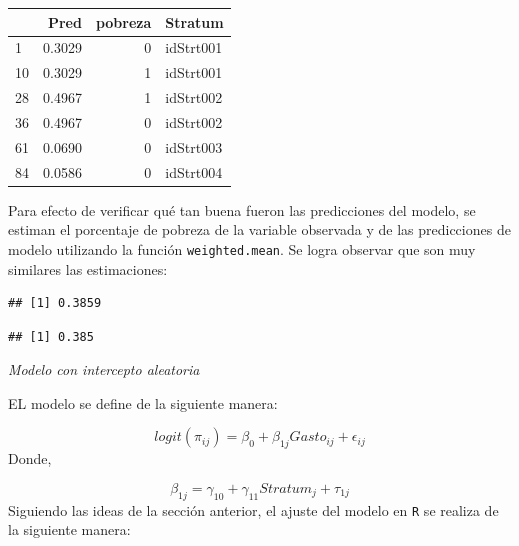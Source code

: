 \documentclass[
  12pt,
]{book}
\newenvironment{Shaded}{\begin{snugshade}}{\end{snugshade}}
\newcommand{\FunctionTok}[1]{\textcolor[rgb]{0.13,0.29,0.53}{\textbf{#1}}}
\newcommand{\NormalTok}[1]{#1}
\newcommand{\SpecialCharTok}[1]{\textcolor[rgb]{0.81,0.36,0.00}{\textbf{#1}}}
\begin{document}
\begin{tabular}{l|r|r|l}
\hline
  & Pred & pobreza & Stratum\\
\hline
1 & 0.3029 & 0 & idStrt001\\
\hline
10 & 0.3029 & 1 & idStrt001\\
\hline
28 & 0.4967 & 1 & idStrt002\\
\hline
36 & 0.4967 & 0 & idStrt002\\
\hline
61 & 0.0690 & 0 & idStrt003\\
\hline
84 & 0.0586 & 0 & idStrt004\\
\hline
\end{tabular}

Para efecto de verificar qué tan buena fueron las predicciones del modelo, se estiman el porcentaje de pobreza de la variable observada y de las predicciones de modelo utilizando la función \texttt{weighted.mean}. Se logra observar que son muy similares las estimaciones:

\begin{Shaded}
\end{Shaded}

\begin{verbatim}
## [1] 0.3859
\end{verbatim}

\begin{Shaded}
\end{Shaded}

\begin{verbatim}
## [1] 0.385
\end{verbatim}

\emph{Modelo con intercepto aleatoria}

EL modelo se define de la siguiente manera:

\[
logit(\pi_{ij})=\beta_{0}+\beta_{1j}Gasto_{ij}+\epsilon_{ij}
\]
Donde,

\[
\beta_{1j} = \gamma_{10}+\gamma_{11}Stratum_{j} + \tau_{1j}
\]
Siguiendo las ideas de la sección anterior, el ajuste del modelo en \texttt{R} se realiza de la siguiente manera:
\end{document}
